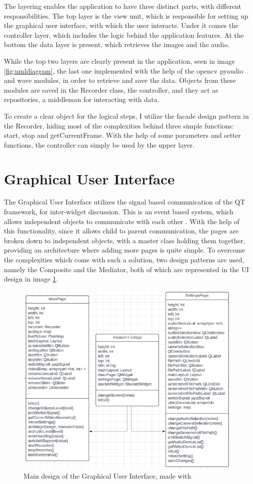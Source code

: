 \par The layering enables the application to have three distinct parts, with different responsibilities. The top layer is the view unit, which is responsible for setting up the graphical user interface, with which the user interacts. Under it comes the controller layer, which includes the logic behind the application features. At the bottom the data layer is present, which retrieves the images and the audio.
\par While the top two layers are clearly present in the application, seen in image \ref{fig:umldiagram}, the last one implemented with the help of the opencv pyaudio and wave modules, in order to retrieve and save the data. Objects from these modules are saved in the Recorder class, the controller, and they act as repositories, a middleman for interacting with data.
\par To create a clear object for the logical steps, I utilize the facade design pattern \cite{facade} in the Recorder, hiding most of the complexities behind three simple functions: start, stop and getCurrentFrame. With the help of some parameters and setter functions, the controller can simply be used by the upper layer.

\section{Graphical User Interface}
\label{sec:designsec1}

\par The Graphical User Interface utilizes the signal based communication of the QT framework, for inter-widget discussion. This is an event based system, which allows independent objects to communicate with each other \cite{qtSignal}. With the help of this functionality, since it allows child to parent communication, the pages are broken down to independent objects, with a master class holding them together, providing an architecture where adding more pages is quite simple. To overcome the complexities which come with such a solution, two design patterns are used, namely the Composite and the Mediator, both of which are represented in the UI design in image \ref{fig:uidesignpattern}.

\begin{figure}
    \centering
    \includegraphics[width=0.6\linewidth]{figures/UIDesignPattern.png}
    \caption{Main design of the Graphical User Interface, made with \cite{lucidchart}}
    \label{fig:uidesignpattern}
\end{figure}

